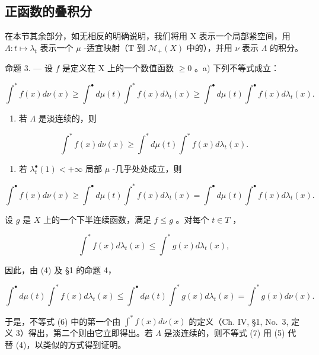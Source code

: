 \subsection{正函数的叠积分}

在本节其余部分，如无相反的明确说明，我们将用 X 表示一个局部紧空间，用 \(\Lambda: t \mapsto \lambda_{t}\) 表示一个 \(\mu\) -适宜映射（T 到 \(\mathcal{M}_{+}(X)\) 中的），并用 \(\nu\) 表示 \(\Lambda\) 的积分。

命题 3. --- 设 \(f\) 是定义在 X 上的一个数值函数 \(\geqslant 0\) 。a) 下列不等式成立：

\[
\int^ {*} f (x) d \nu (x) \geqslant \int^ {\bullet} d \mu (t) \int^ {*} f (x) d \lambda_ {t} (x) \geqslant \int^ {\bullet} d \mu (t) \int^ {\bullet} f (x) d \lambda_ {t} (x). \tag {6}
\]

\begin{enumerate}
\def\labelenumi{\alph{enumi})}
\setcounter{enumi}{1}
\tightlist
\item
  若 \(\Lambda\) 是淡连续的，则
\end{enumerate}

\[
\int^ {*} f (x) d \nu (x) \geqslant \int^ {*} d \mu (t) \int^ {*} f (x) d \lambda_ {t} (x).\tag{7}
\]

\begin{enumerate}
\def\labelenumi{\alph{enumi})}
\setcounter{enumi}{2}
\tightlist
\item
  若 \(\lambda_t^\bullet (1) <   + \infty\) 局部 \(\mu\) -几乎处处成立，则
\end{enumerate}

\[
\int^ {\bullet} f (x) d \nu (x) \geqslant \int^ {\bullet} d \mu (t) \int^ {*} f (x) d \lambda_ {t} (x) = \int^ {\bullet} d \mu (t) \int^ {\bullet} f (x) d \lambda_ {t} (x). \tag {8}
\]

设 \(g\) 是 \(X\) 上的一个下半连续函数，满足 \(f \leqslant g\) 。对每个 \(t \in T\) ，

\[
\int^ {*} f (x) d \lambda_ {t} (x) \leqslant \int^ {*} g (x) d \lambda_ {t} (x),
\]

因此，由 (4) 及 §1 的命题 4，

\[
\int^ {\bullet} d \mu (t) \int^ {*} f (x) d \lambda_ {t} (x) \leqslant \int^ {\bullet} d \mu (t) \int^ {*} g (x) d \lambda_ {t} (x) = \int^ {*} g (x) d \nu (x).
\]

于是，不等式 (6) 中的第一个由 \(\int^{*}f(x)d\nu(x)\) 的定义（Ch. IV, §1, No.~3, 定义 3）得出，第二个则由它立即得出。若 \(\Lambda\) 是淡连续的，则不等式 (7) 用 (5) 代替 (4)，以类似的方式得到证明。

